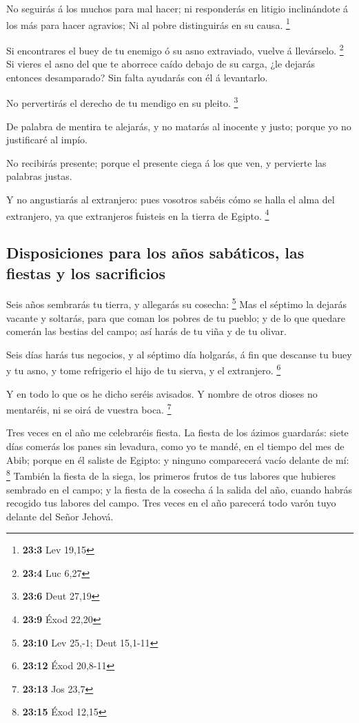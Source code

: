  No seguirás á los muchos para mal hacer; ni responderás en
litigio inclinándote á los más para hacer agravios;  Ni al
pobre distinguirás en su causa. \footnote{\textbf{23:3} Lev 19,15}

 Si encontrares el buey de tu enemigo ó su asno extraviado,
vuelve á llevárselo. \footnote{\textbf{23:4} Luc 6,27}  Si
vieres el asno del que te aborrece caído debajo de su carga, ¿le dejarás
entonces desamparado? Sin falta ayudarás con él á levantarlo.

 No pervertirás el derecho de tu mendigo en su pleito.
\footnote{\textbf{23:6} Deut 27,19}

 De palabra de mentira te alejarás, y no matarás al inocente
y justo; porque yo no justificaré al impío.

 No recibirás presente; porque el presente ciega á los que
ven, y pervierte las palabras justas.

 Y no angustiarás al extranjero: pues vosotros sabéis cómo
se halla el alma del extranjero, ya que extranjeros fuisteis en la
tierra de Egipto. \footnote{\textbf{23:9} Éxod 22,20}

\hypertarget{disposiciones-para-los-auxf1os-sabuxe1ticos-las-fiestas-y-los-sacrificios}{%
\subsection{Disposiciones para los años sabáticos, las fiestas y los
sacrificios}\label{disposiciones-para-los-auxf1os-sabuxe1ticos-las-fiestas-y-los-sacrificios}}

 Seis años sembrarás tu tierra, y allegarás su cosecha:
\footnote{\textbf{23:10} Lev 25,-1; Deut 15,1-11}  Mas el
séptimo la dejarás vacante y soltarás, para que coman los pobres de tu
pueblo; y de lo que quedare comerán las bestias del campo; así harás de
tu viña y de tu olivar.

 Seis días harás tus negocios, y al séptimo día holgarás, á
fin que descanse tu buey y tu asno, y tome refrigerio el hijo de tu
sierva, y el extranjero. \footnote{\textbf{23:12} Éxod 20,8-11}

 Y en todo lo que os he dicho seréis avisados. Y nombre de
otros dioses no mentaréis, ni se oirá de vuestra boca. \footnote{\textbf{23:13}
  Jos 23,7}

 Tres veces en el año me celebraréis fiesta. 
La fiesta de los ázimos guardarás: siete días comerás los panes sin
levadura, como yo te mandé, en el tiempo del mes de Abib; porque en él
saliste de Egipto: y ninguno comparecerá vacío delante de mí:
\footnote{\textbf{23:15} Éxod 12,15}  También la fiesta de
la siega, los primeros frutos de tus labores que hubieres sembrado en el
campo; y la fiesta de la cosecha á la salida del año, cuando habrás
recogido tus labores del campo.  Tres veces en el año
parecerá todo varón tuyo delante del Señor Jehová.

